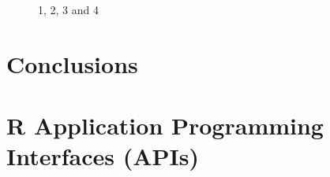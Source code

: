 \begin{figure}[H]
	\centering
	\begin{minipage}[b]{0.5\linewidth}
	\end{minipage}\hfill
	\begin{minipage}[b]{0.5\linewidth}
	\end{minipage}\hfill	
	\begin{minipage}[b]{0.5\linewidth}
	\end{minipage}\hfill
	\begin{minipage}[b]{0.5\linewidth}
	\end{minipage}\hfill
	\caption{1, 2, 3 and 4}
	\label{fig:Figure1}
\end{figure} 


\section{Conclusions}


\section{R Application Programming Interfaces (APIs)}

